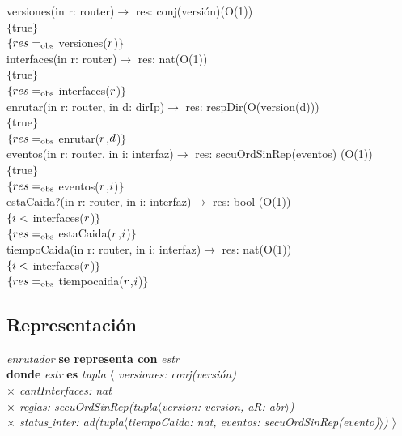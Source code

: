 versiones(in r: router)$\longrightarrow$ res: conj(versi\'on)\hfill(O(1)) \\
$\{$true$\}$\\
$\{{res}=_{\mathrm{obs}}$ versiones(${r}$)$\}$\\

interfaces(in r: router)$\longrightarrow$ res: nat\hfill(O(1)) \\
$\{$true$\}$\\
$\{{res} =_{\mathrm{obs}}$ interfaces(${r}$)$\}$\\

enrutar(in r: router, in d: dirIp)$\longrightarrow$ res: respDir\hfill(O(version(d))) \\
$\{$true$\}$\\
$\{{res} =_{\mathrm{obs}}$ enrutar(${r}$,${d}$)$\}$\\

eventos(in r: router, in i: interfaz)$\longrightarrow$ res: secuOrdSinRep(eventos) \hfill(O(1)) \\
$\{$true$\}$\\
$\{{res} =_{\mathrm{obs}}$ eventos(${r}$,${i}$)$\}$\\

estaCaida?(in r: router, in i: interfaz)$\longrightarrow$ res: bool \hfill(O(1)) \\
$\{{i} <$ interfaces(${r}$)$\}$\\
$\{{res} =_{\mathrm{obs}}$ estaCaida(${r}$,${i}$)$\}$\\

tiempoCaida(in r: router, in i: interfaz)$\longrightarrow$ res: nat\hfill(O(1)) \\
$\{{i} <$ interfaces(${r}$)$\}$\\
$\{{res} =_{\mathrm{obs}}$ tiempocaida(${r}$,${i}$)$\}$\\


\subsection*{Representaci\'on}
\textit{enrutador} \textbf{se representa con} \textit{estr}\\
\textbf{donde} \textit{estr} \textbf{es} \textit{tupla $\langle$ versiones: conj(versi\'on)\\
\hspace*{3.5cm} $\times$  cantInterfaces: nat\\
\hspace*{3.5cm} $\times$  reglas: secuOrdSinRep(tupla$\langle$version: version, aR: abr$\rangle$)\\ %
\hspace*{3.5cm} $\times$  status$\_$inter: ad(tupla$\langle$tiempoCaida: nat, eventos: secuOrdSinRep(evento)$\rangle$) $\rangle$}
\vspace{22pt}

